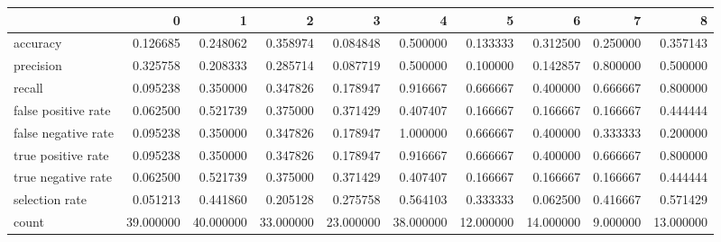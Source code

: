\begin{tabular}{lrrrrrrrrr}
\toprule
{} &          0 &          1 &          2 &          3 &          4 &          5 &          6 &         7 &          8 \\
\midrule
accuracy            &   0.126685 &   0.248062 &   0.358974 &   0.084848 &   0.500000 &   0.133333 &   0.312500 &  0.250000 &   0.357143 \\
precision           &   0.325758 &   0.208333 &   0.285714 &   0.087719 &   0.500000 &   0.100000 &   0.142857 &  0.800000 &   0.500000 \\
recall              &   0.095238 &   0.350000 &   0.347826 &   0.178947 &   0.916667 &   0.666667 &   0.400000 &  0.666667 &   0.800000 \\
false positive rate &   0.062500 &   0.521739 &   0.375000 &   0.371429 &   0.407407 &   0.166667 &   0.166667 &  0.166667 &   0.444444 \\
false negative rate &   0.095238 &   0.350000 &   0.347826 &   0.178947 &   1.000000 &   0.666667 &   0.400000 &  0.333333 &   0.200000 \\
true positive rate  &   0.095238 &   0.350000 &   0.347826 &   0.178947 &   0.916667 &   0.666667 &   0.400000 &  0.666667 &   0.800000 \\
true negative rate  &   0.062500 &   0.521739 &   0.375000 &   0.371429 &   0.407407 &   0.166667 &   0.166667 &  0.166667 &   0.444444 \\
selection rate      &   0.051213 &   0.441860 &   0.205128 &   0.275758 &   0.564103 &   0.333333 &   0.062500 &  0.416667 &   0.571429 \\
count               &  39.000000 &  40.000000 &  33.000000 &  23.000000 &  38.000000 &  12.000000 &  14.000000 &  9.000000 &  13.000000 \\
\bottomrule
\end{tabular}
